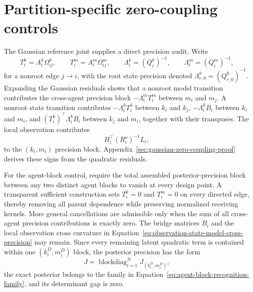 \section{Partition-specific zero-coupling controls}

The Gaussian reference joint supplies a direct precision audit. Write
\begin{equation}
T_i^k=A_i^k\Omega_{ij}^k,
\qquad
T_i^m=A_i^m\Omega_{ij}^m,
\qquad
\Lambda_i^k=(Q_i^k)^{-1},
\qquad
\Lambda_i^m=(Q_i^m)^{-1},
\label{eq:gaussian-transition-precision-notation}
\end{equation}
for a nonroot edge \(j\to i\), with the root state precision denoted \(\Lambda_{r,0}^k=(Q_{r,0}^k)^{-1}\). Expanding the Gaussian residuals shows that a nonroot model transition contributes the cross-agent precision block \(-\Lambda_i^mT_i^m\) between \(m_i\) and \(m_j\). A nonroot state transition contributes \(-\Lambda_i^kT_i^k\) between \(k_i\) and \(k_j\), \(-\Lambda_i^kB_i\) between \(k_i\) and \(m_i\), and \((T_i^k)^\top\Lambda_i^kB_i\) between \(k_j\) and \(m_i\), together with their transposes. The local observation contributes
\begin{equation}
H_i^\top(R_i^o)^{-1}L_i,
\label{eq:observation-state-model-cross-precision}
\end{equation}
to the \((k_i,m_i)\) precision block. Appendix~\ref{sec:gaussian-zero-coupling-proof} derives these signs from the quadratic residuals.

For the agent-block control, require the total assembled posterior-precision block between any two distinct agent blocks to vanish at every design point. A transparent sufficient construction sets \(T_i^k=0\) and \(T_i^m=0\) on every directed edge, thereby removing all parent dependence while preserving normalized receiving kernels. More general cancellations are admissible only when the sum of all cross-agent precision contributions is exactly zero. The bridge matrices \(B_i\) and the local observation cross curvature in Equation~\eqref{eq:observation-state-model-cross-precision} may remain. Since every remaining latent quadratic term is contained within one \((k_i^D,m_i^D)\) block, the posterior precision has the form
\begin{equation}
J=\operatorname{blockdiag}_{i=1}^{N}J_{(k_i^D,m_i^D)},
\label{eq:agent-block-zero-coupling-precision}
\end{equation}
the exact posterior belongs to the family in Equation~\eqref{eq:agent-block-recognition-family}, and its determinant gap is zero.

